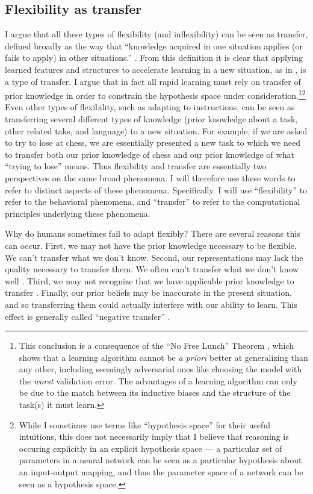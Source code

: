 \subsection{Flexibility as transfer}
I argue that all these types of flexibility (and inflexibility) can be seen as transfer, defined broadly as the way that ``knowledge acquired in one situation applies (or fails to apply) in other situations.'' \citep{Singley1989}. From this definition it is clear that applying learned features and structures to accelerate learning in a new situation, as in \citet{Bourne1970}, is a type of transfer. I argue that in fact all rapid learning must rely on transfer of prior knowledge in order to constrain the hypothesis space under consideration.\footnote{This conclusion is a consequence of the ``No Free Lunch'' Theorem \citep{Wolpert1996}, which shows that a learning algorithm cannot be \emph{a priori} better at generalizing than any other, including seemingly adversarial ones like choosing the model with the \emph{worst} validation error. The advantages of a learning algorithm can only be due to the match between its inductive biases and the structure of the task(s) it must learn.}\footnote{While I sometimes use terms like ``hypothesis space'' for their useful intuitions, this does not necessarily imply that I believe that reasoning is occuring explicitly in an explicit hypothesis space --- a particular set of parameters in a neural network can be seen as a particular hypothesis about an input-output mapping, and thus the parameter space of a network can be seen as a hypothesis space.} Even other types of flexibility, such as adapting to instructions, can be seen as transferring several different types of knowledge (prior knowledge about a task, other related taks, and language) to a new situation. For example, if we are asked to try to lose at chess, we are essentially presented a new task to which we need to transfer both our prior knowledge of chess and our prior knowledge of what ``trying to lose'' means. Thus flexibility and transfer are essentially two perspectives on the same broad phenomena. I will therefore use these words to refer to distinct aspects of these phenomena. Specifically. I will use ``flexibility'' to refer to the behavioral phenomena, and ``transfer'' to refer to the computational principles underlying these phenomena. \par  
Why do humans sometimes fail to adapt flexibly? There are several reasons this can occur. First, we may not have the prior knowledge necessary to be flexible. We can't transfer what we don't know. Second, our representations may lack the quality necessary to transfer them. We often can't transfer what we don't know well \citep[c.f.][]{Karmiloff-Smith1992, Hazzan1999, Weber2001}. Third, we may not recognize that we have applicable prior knowledge to transfer \citep{Detterman1993}. Finally, our prior beliefs may be inaccurate in the present situation, and so transferring them could actually interfere with our ability to learn. This effect is generally called ``negative transfer'' \citep{Singley1989}. \par
